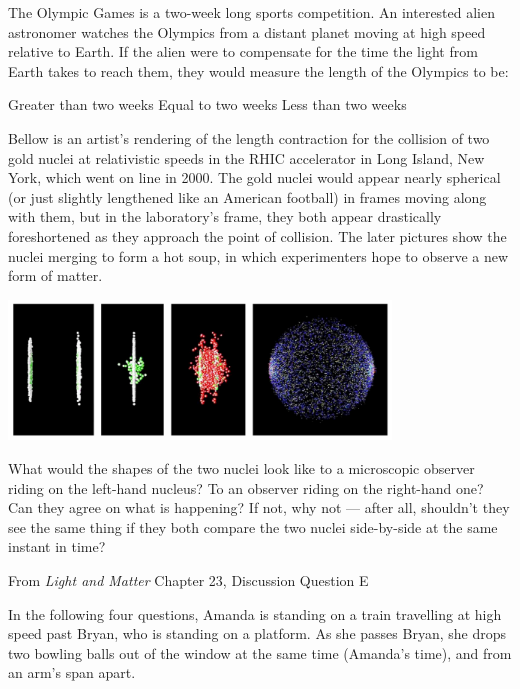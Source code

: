 \documentclass[12pt]{exam}
\begin{document}
\begin{questions}
\clearpage
\question The Olympic Games is a two-week long sports competition. An interested alien astronomer watches the Olympics
from a distant planet moving at high speed relative to Earth. If the alien were to compensate for the time the
light from Earth takes to reach them, they would measure the length of the Olympics to be:
\begin{choices}
	\choice Greater than two weeks
	\choice Equal to two weeks
	\choice Less than two weeks
\end{choices}

\question Bellow is an artist’s rendering of the length contraction for
the collision of two gold nuclei at relativistic speeds in the RHIC
accelerator in Long Island, New York, which went on line in 2000.
The gold nuclei would appear nearly spherical (or just slightly
lengthened like an American football) in frames moving along with
them, but in the laboratory’s frame, they both appear drastically
foreshortened as they approach the point of collision. The later
pictures show the nuclei merging to form a hot soup, in which
experimenters hope to observe a new form of matter.

\begin{center}
\includegraphics[width=4in]{../images/nuclei.png}
\end{center}

What would the shapes of the two
nuclei look like to a microscopic observer riding on the left-hand nucleus?
To an observer riding on the right-hand one? Can they agree on what is
happening? If not, why not — after all, shouldn’t they see the same thing
if they both compare the two nuclei side-by-side at the same instant in
time?

From \textit{Light and Matter} Chapter 23,  Discussion Question E

\clearpage
\question In the following four questions, Amanda is standing on a train travelling at high speed past Bryan, who is standing
on a platform. As she passes Bryan, she drops two bowling balls out of the window at the same time (Amanda’s
time), and from an arm’s span apart.
\begin{center}

\end{center}
\begin{parts}

\end{parts}
\end{questions}
\end{document}
